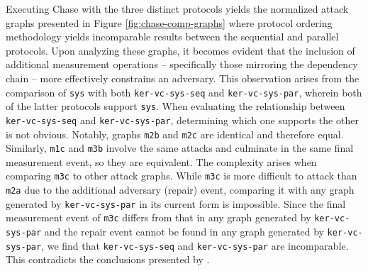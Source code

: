 \documentclass[runningheads]{llncs}
\theoremstyle{definition}
\begin{document}

Executing Chase with the three distinct protocols yields the normalized attack graphs presented in Figure \ref{fig:chase-comp-graphs} where protocol ordering methodology yields incomparable results between the sequential and parallel protocols. Upon analyzing these graphs, it becomes evident that the inclusion of additional measurement operations -- specifically those mirroring the dependency chain -- more effectively constrains an adversary. This observation arises from the comparison of \texttt{sys} with both \texttt{ker-vc-sys-seq} and \texttt{ker-vc-sys-par}, wherein both of the latter protocols support \texttt{sys}. When evaluating the relationship between \texttt{ker-vc-sys-seq} and \texttt{ker-vc-sys-par}, determining which one supports the other is not obvious. Notably, graphs \texttt{m2b} and \texttt{m2c} are identical and therefore equal. Similarly, \texttt{m1c} and \texttt{m3b} involve the same attacks and culminate in the same final measurement event, so they are equivalent. The complexity arises when comparing \texttt{m3c} to other attack graphs. While \texttt{m3c} is more difficult to attack than \texttt{m2a} due to the additional adversary (repair) event, comparing it with any graph generated by \texttt{ker-vc-sys-par} in its current form is impossible. Since the final measurement event of \texttt{m3c} differs from that in any graph generated by \texttt{ker-vc-sys-par} and the repair event cannot be found in any graph generated by \texttt{ker-vc-sys-par}, we find that \texttt{ker-vc-sys-seq} and \texttt{ker-vc-sys-par} are incomparable. This contradicts the conclusions presented by \citet{Rowe:2021:AutomatedTrust}. 
\end{document}
